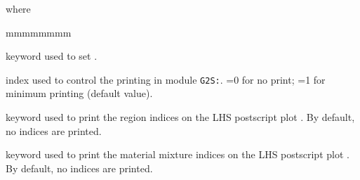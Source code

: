 \noindent where
\begin{ListeDeDescription}{mmmmmmmm}

\item[\moc{EDIT}] keyword used to set .

\item[\dusa{iprint}] index used to control the printing in module {\tt G2S:}. =0 for no print; =1 for minimum printing (default value).

\item[\moc{DRAWNOD}] keyword used to print the region indices on the LHS postscript plot . By default, no indices are printed.

\item[\moc{DRAWMIX}] keyword used to print the material mixture indices on the LHS postscript plot . By default, no indices are printed.

\end{ListeDeDescription}


\clearpage
